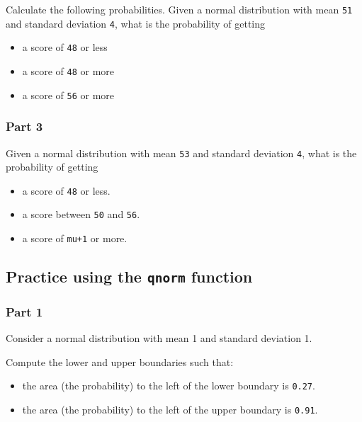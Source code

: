 \documentclass[12pt,]{krantz}
\providecommand{\tightlist}{%
  \setlength{\itemsep}{0pt}\setlength{\parskip}{0pt}}
\begin{document}
Calculate the following probabilities.
Given a normal distribution with mean \texttt{51} and standard deviation \texttt{4}, what is the probability of getting

\begin{itemize}
\tightlist
\item
  a score of \texttt{48} or less
\item
  a score of \texttt{48} or more
\item
  a score of \texttt{56} or more
\end{itemize}

\hypertarget{part-3}{%
\subsubsection{Part 3}\label{part-3}}

Given a normal distribution with mean \texttt{53} and standard deviation \texttt{4}, what is the probability of getting

\begin{itemize}
\tightlist
\item
  a score of \texttt{48} or less.
\item
  a score between \texttt{50} and \texttt{56}.
\item
  a score of \texttt{mu+1} or more.
\end{itemize}

\hypertarget{practice-using-the-qnorm-function}{%
\subsection{\texorpdfstring{Practice using the \texttt{qnorm} function}{Practice using the qnorm function}}\label{practice-using-the-qnorm-function}}

\hypertarget{part-1-1}{%
\subsubsection{Part 1}\label{part-1-1}}

Consider a normal distribution with mean 1 and standard deviation 1.

Compute the lower and upper boundaries such that:

\begin{itemize}
\tightlist
\item
  the area (the probability) to the left of the lower boundary is \texttt{0.27}.
\item
  the area (the probability) to the left of the upper boundary is \texttt{0.91}.
\end{itemize}
\end{document}
